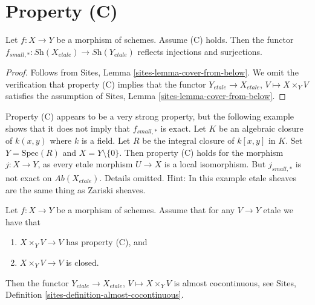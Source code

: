 \section{Property (C)}
\label{section-C}

\begin{lemma}
\label{lemma-property-C-implies}
Let $f : X \to Y$ be a morphism of schemes. Assume (C) holds. Then the functor
$f_{small, *} : \textit{Sh}(X_{etale}) \to \textit{Sh}(Y_{etale})$ reflects
injections and surjections.
\end{lemma}

\begin{proof}
Follows from
Sites, Lemma \ref{sites-lemma-cover-from-below}.
We omit the verification that property (C) implies that the functor
$Y_{etale} \to X_{etale}$, $V \mapsto X \times_Y V$ satisfies the
assumption of
Sites, Lemma \ref{sites-lemma-cover-from-below}.
\end{proof}

\begin{remark}
\label{remark-property-C-strong}
Property (C) appears to be a very strong property, but the following
example shows that it does not imply that $f_{small, *}$ is exact.
Let $K$ be an algebraic closure of $k(x, y)$ where $k$ is a field.
Let $R$ be the integral closure of $k[x, y]$ in $K$.
Set $Y = \text{Spec}(R)$ and $X = Y \setminus \{0\}$.
Then property (C) holds for the morphism $j : X \to Y$, as every etale
morphism $U \to X$ is a local isomorphism. But $j_{small, *}$ is not exact on
$\textit{Ab}(X_{etale})$. Details omitted. Hint: In this example etale
sheaves are the same thing as Zariski sheaves.
\end{remark}

\begin{lemma}
\label{lemma-property-C-closed-implies}
Let $f : X \to Y$ be a morphism of schemes. Assume that
for any $V \to Y$ etale we have that
\begin{enumerate}
\item $X \times_Y V \to V$ has property (C), and
\item $X \times_Y V \to V$ is closed.
\end{enumerate}
Then the functor $Y_{etale} \to X_{etale}$, $V \mapsto X \times_Y V$ is
almost cocontinuous, see
Sites, Definition \ref{sites-definition-almost-cocontinuous}.
\end{lemma}

